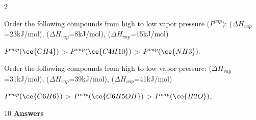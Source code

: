 \documentclass[main.tex]{subfiles}
\begin{document}
\begin{multicols*}{2}
\begin{question}[ID=\the\value{numA}]
Order the following compounds from high to low vapor pressure ($P^{vap}$):  ($\Delta H_{vap}$=23kJ/mol),  ($\Delta H_{vap}$=8kJ/mol),  ($\Delta H_{vap}$=15kJ/mol)
\end{question}
\begin{solution}
$P^{vap}(\ce{CH4})$ > $P^{vap}(\ce{C4H10})$ > $P^{vap}(\ce{NH3})$.  
 \hspace{0.1cm}\end{solution}
\begin{question}[ID=\the\value{numA}]
Order the following compounds from high to low vapor pressure:  ($\Delta H_{vap}$=31kJ/mol),  ($\Delta H_{vap}$=39kJ/mol),  ($\Delta H_{vap}$=41kJ/mol)
\end{question}
\begin{solution}
$P^{vap}(\ce{C6H6})$ > $P^{vap}(\ce{C6H5OH})$ > $P^{vap}(\ce{H2O})$.  
 \hspace{0.1cm}\end{solution}









\end{multicols*}
\newpage
\begin{answersenvironment}
\begin{minipage}[c]{1\textwidth}
\begin{localsize}{10}
{\Large \bf Answers}
\printsolutions[byID={1,3,5,7,9,11,13,15,17, 19,21,23,25,27, 29}]
\end{localsize}
\end{minipage}\end{answersenvironment}
\end{document}
